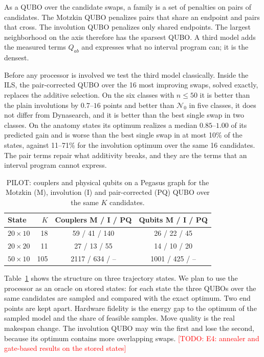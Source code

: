 \documentclass[10pt,twocolumn]{article}
\newcommand{\todo}[1]{\textcolor{red}{[TODO: #1]}}
\newcommand{\N}{\mathcal{N}}
\begin{document}
As a QUBO over the candidate swaps, a family is a set of penalties on
pairs of candidates. The Motzkin QUBO penalizes pairs that share an
endpoint and pairs that cross. The involution QUBO penalizes only shared
endpoints. The largest neighborhood on the axis therefore has the
sparsest QUBO. A third model adds the measured terms $Q_{ab}$ and
expresses what no interval program can; it is the densest.

Before any processor is involved we test the third model classically.
Inside the ILS, the pair-corrected QUBO over the 16 most improving
swaps, solved exactly, replaces the additive selection. On the six
classes with $n\leq50$ it is better than the plain involutions by
$0.7$--$16$ points and better than $\N_0$ in five classes, it does not
differ from Dynasearch, and it is better than the best single swap in
two classes. On the anatomy states its optimum realizes a median
$0.85$--$1.00$ of its predicted gain and is worse than the best single
swap in at most 10\% of the states, against 11--71\% for the involution
optimum over the same 16 candidates. The pair terms repair what
additivity breaks, and they are the terms that an interval program
cannot express.

\begin{table}[t]
\centering
\caption{PILOT: couplers and physical qubits on a Pegasus graph for the
Motzkin (M), involution (I) and pair-corrected (PQ) QUBO over the same
$K$ candidates.}
\label{tab:qubo}
\small
\begin{tabular}{@{}lrcc@{}}
\toprule
State & $K$ & Couplers M / I / PQ & Qubits M / I / PQ \\
\midrule
$20\times10$ & 18 & 59 / 41 / 140 & 26 / 22 / 45 \\
$20\times20$ & 11 & 27 / 13 / 55 & 14 / 10 / 20 \\
$50\times10$ & 105 & 2117 / 634 / -- & 1001 / 425 / -- \\
\bottomrule
\end{tabular}
\end{table}

Table~\ref{tab:qubo} shows the structure on three trajectory states. We
plan to use the processor as an oracle on stored states: for each state
the three QUBOs over the same candidates are sampled and compared with
the exact optimum. Two end points are kept apart. Hardware fidelity is
the energy gap to the optimum of the sampled model and the share of
feasible samples. Move quality is the real makespan change. The
involution QUBO may win the first and lose the second, because its
optimum contains more overlapping swaps. \todo{E4: annealer and
gate-based results on the stored states}
\end{document}
